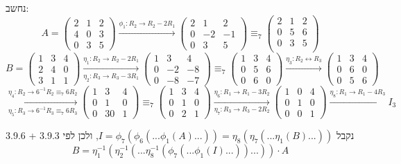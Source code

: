 \documentclass{article}
\begin{document}
נחשב:
\[
    A = \begin{pmatrix}
        2 & 1 & 2 \\
        4 & 0 & 3 \\
        0 & 3 & 5
    \end{pmatrix}
    \xrightarrow{\phi_1: R_2\rightarrow R_2-2R_1}
    \begin{pmatrix}
        2 & 1  & 2  \\
        0 & -2 & -1 \\
        0 & 3  & 5
    \end{pmatrix}
    \equiv_7
    \begin{pmatrix}
        2 & 1 & 2 \\
        0 & 5 & 6 \\
        0 & 3 & 5 \\
    \end{pmatrix}
\]
\[
    B = \begin{pmatrix}
        1 & 3 & 4 \\
        2 & 4 & 0 \\
        3 & 1 & 1
    \end{pmatrix}
    \xrightarrow[\eta_2: R_3\rightarrow R_3-3R_1]{\eta_1: R_2\rightarrow R_2-2R_1}
    \begin{pmatrix}
        1 & 3  & 4  \\
        0 & -2 & -8 \\
        0 & -8 & -7
    \end{pmatrix}
    \equiv_7
    \begin{pmatrix}
        1 & 3 & 4 \\
        0 & 5 & 6 \\
        0 & 6 & 0
    \end{pmatrix}
    \xrightarrow{\eta_3: R_2\leftrightarrow R_3}
    \begin{pmatrix}
        1 & 3 & 4 \\
        0 & 6 & 0 \\
        0 & 5 & 6
    \end{pmatrix}
\]
\[
    \xrightarrow[\eta_5: R_3\rightarrow 6^{-1}R_3\equiv_7 6R_3]{\eta_4: R_2\rightarrow 6^{-1}R_2\equiv_7 6R_2}
    \begin{pmatrix}
        1 & 3  & 4 \\
        0 & 1  & 0 \\
        0 & 30 & 1
    \end{pmatrix}
    \equiv_7
    \begin{pmatrix}
        1 & 3 & 4 \\
        0 & 1 & 0 \\
        0 & 2 & 1
    \end{pmatrix}
    \xrightarrow[\eta_7: R_3\rightarrow R_3-2R_2]{\eta_6: R_1\rightarrow R_1-3R_2}
    \begin{pmatrix}
        1 & 0 & 4 \\
        0 & 1 & 0 \\
        0 & 0 & 1
    \end{pmatrix}
    \xrightarrow{\eta_8: R_1\rightarrow R_1-4R_3}
    I_3
\]

נקבל $I=\phi_7(\phi_6(...\phi_1(A)...))=\eta_8(\eta_7(...\eta_1(B)...))$,
ולכן לפי 3.9.3 + 3.9.6
\[
    B=\eta^{-1}_1(\eta^{-1}_2(...\eta^{-1}_8(\phi_7(...\phi_1(I)...))...)) \cdot A
\]
\end{document}
